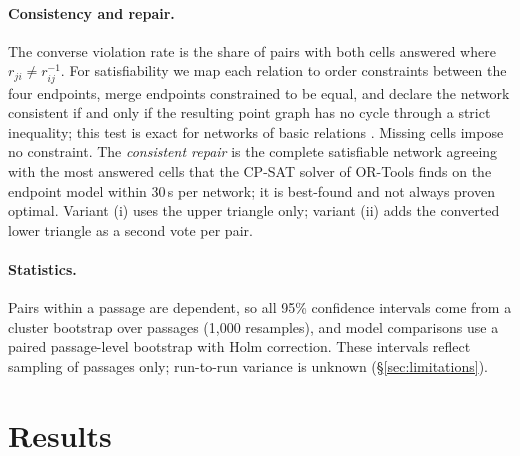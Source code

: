 \documentclass[11pt]{article}
\begin{document}
\paragraph{Consistency and repair.}
The converse violation rate is the share of pairs with both cells answered where $r_{ji}\neq r_{ij}^{-1}$. For satisfiability we map each relation to order constraints between the four endpoints, merge endpoints constrained to be equal, and declare the network consistent if and only if the resulting point graph has no cycle through a strict inequality; this test is exact for networks of basic relations \citep{vilain1990constraint}. Missing cells impose no constraint. The \emph{consistent repair} is the complete satisfiable network agreeing with the most answered cells that the CP-SAT solver of OR-Tools finds on the endpoint model within 30\,s per network; it is best-found and not always proven optimal. Variant (i) uses the upper triangle only; variant (ii) adds the converted lower triangle as a second vote per pair.

\paragraph{Statistics.}
Pairs within a passage are dependent, so all 95\% confidence intervals come from a cluster bootstrap over passages (1,000 resamples), and model comparisons use a paired passage-level bootstrap with Holm correction. These intervals reflect sampling of passages only; run-to-run variance is unknown (\S\ref{sec:limitations}).

\section{Results}
\label{sec:results}
\end{document}
